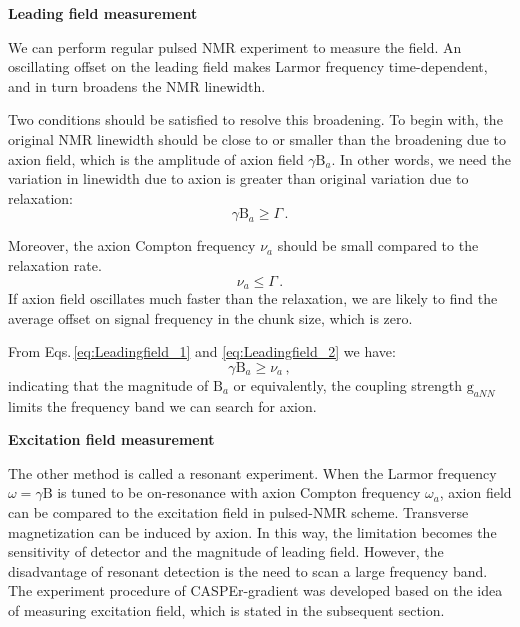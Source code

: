 \textbf{Leading field measurement}

We can perform regular pulsed NMR experiment to measure the field. An oscillating offset on the leading field makes Larmor frequency time-dependent, and in turn broadens the NMR linewidth.


Two conditions should be satisfied to resolve this broadening. To begin with, the original NMR linewidth should be close to or smaller than the broadening due to axion field, which is the amplitude of axion field $\gamma \mathrm{B}_a$. In other words, we need the variation in linewidth due to axion is greater than original variation due to relaxation:
\begin{equation}
    \gamma \mathrm{B}_a \geq  \Gamma\,.\label{eq:Leadingfield_1}
\end{equation}

Moreover, the axion Compton frequency $\nu_a$ should be small compared to the relaxation rate. 
\begin{equation}
    \nu_a \leq \Gamma\,.\label{eq:Leadingfield_2}
\end{equation}
If axion field oscillates much faster than the relaxation, we are likely to find the average offset on signal frequency in the chunk size, which is zero. 

From Eqs.\,\eqref{eq:Leadingfield_1} and \eqref{eq:Leadingfield_2} we have:
\begin{equation}
    \gamma \mathrm{B}_a \geq \nu_a\,,\label{eq:offset_condition}
\end{equation}
indicating that the magnitude of $\mathrm{B}_{a}$ or equivalently, the coupling strength $\mathrm{g}_{aNN}$ limits the frequency band we can search for axion. 


\textbf{Excitation field measurement}

The other method is called a resonant experiment. When the Larmor frequency $\omega = \gamma \mathrm{B}$ is tuned to be on-resonance with axion Compton frequency $\omega_a$, axion field can be compared to the excitation field in pulsed-NMR scheme. Transverse magnetization can be induced by axion. In this way, the limitation becomes the sensitivity of detector and the magnitude of leading field. However, the disadvantage of resonant detection is the need to scan a large frequency band. The experiment procedure of CASPEr-gradient was developed based on the idea of measuring excitation field, which is stated in the subsequent section. 

